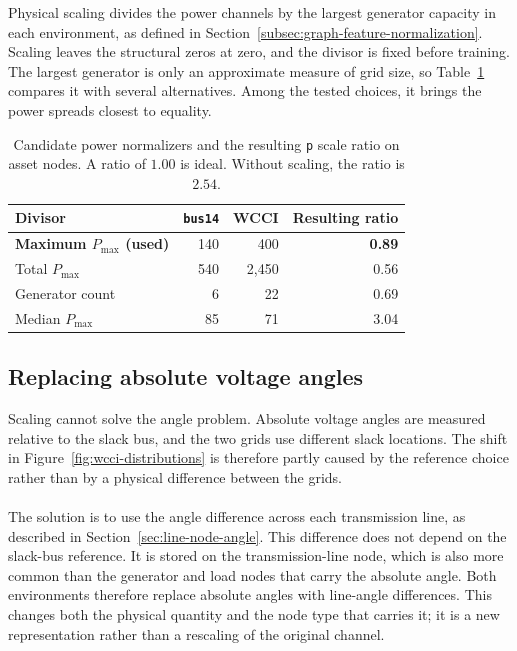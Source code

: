 Physical scaling divides the power channels by the largest
generator capacity in each environment, as defined in
Section~\ref{subsec:graph-feature-normalization}. Scaling leaves the
structural zeros at zero, and the divisor is fixed before training. The largest
generator is only an approximate measure of grid size, so
Table~\ref{tab:wcci-normalizer} compares it with several alternatives. Among
the tested choices, it brings the power spreads closest to equality.

\begin{table}[H]
  \centering
  \small
  \caption{Candidate power normalizers and the resulting \texttt{p} scale ratio
  on asset nodes. A ratio of $1.00$ is ideal. Without scaling, the ratio is
  $2.54$.}
  \label{tab:wcci-normalizer}
  \setlength{\tabcolsep}{8pt}
  \begin{tabular}{lrrr}
    \toprule
    Divisor & \texttt{bus14} & WCCI & Resulting ratio \\
    \midrule
    \textbf{Maximum $P_{\max}$ (used)} & 140 & 400 & \textbf{0.89} \\
    Total $P_{\max}$ & 540 & 2{,}450 & 0.56 \\
    Generator count & 6 & 22 & 0.69 \\
    Median $P_{\max}$ & 85 & 71 & 3.04 \\
    \bottomrule
  \end{tabular}
\end{table}

\subsection{Replacing absolute voltage angles}
\label{sec:wcci-angle-representation}

Scaling cannot solve the angle problem. Absolute voltage angles
are measured relative to the slack bus, and the two grids use different slack
locations. The shift in Figure~\ref{fig:wcci-distributions} is therefore partly
caused by the reference choice rather than by a physical difference between the
grids.
\\
\\
The solution is to use the angle difference across each
transmission line, as described in Section~\ref{sec:line-node-angle}. This
difference does not depend on the slack-bus reference. It is stored on the
transmission-line node, which is also more common than the generator and load
nodes that carry the absolute angle. Both environments therefore replace
absolute angles with line-angle differences. This changes both the physical
quantity and the node type that carries it; it is a new representation rather
than a rescaling of the original channel.

